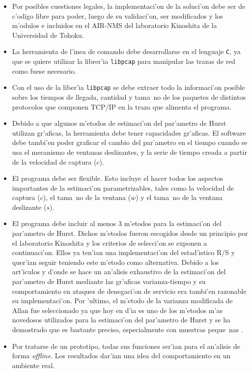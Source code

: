 \begin{itemize}
\item Por posibles cuestiones legales, la implementaci'on de la soluci'on 
debe ser de c'odigo libre para poder, luego de su validaci'on, ser
modificados y los m'odulos e incluidos en el AIR-NMS del laboratorio Kinoshita
de la Universidad de Tohoku.
\item La herramienta de l'inea de comando debe desarrollarse en el lenguaje
{\tt C}, ya que se quiere utilizar la librer'ia {\tt libpcap} para manipular
las trazas de red como fuese necesario.
\item Con el uso de la liber'ia {\tt libpcap} se debe extraer todo la
informaci'on posible sobre los tiempos de llegada, cantidad y tama~no de los
paquetes de distintos protocolos que componen TCP/IP en la traza que alimenta
el programa.
\item Debido a que algunos m'etodos de estimaci'on del par'ametro de Hurst
utilizan gr'aficas, la herramienta debe tener capacidades gr'aficas. 
El software debe tambi'en poder graficar el cambio del par'ametro en el tiempo
cuando se usa el mecanismo de ventanas deslizantes, y la serie de tiempo
creada a partir de la velocidad de captura ($c$).
\item El programa debe ser flexible. Esto incluye el hacer todos los aspectos
importantes de la estimaci'on parametrizables, tales como la velocidad de 
captura ($c$), el tama~no de la ventana ($w$) y el tama~no de la ventana
deslizante ($s$).
\item El programa debe incluir al menos 3 m'etodos para la estimaci'on del 
par'ametro de Hurst. Dichos m'etodos fueron escogidos desde un principio por
el laboratorio Kinoshita y los criterios de selecci'on se exponen a
continuaci'on. Ellos ya ten'ian una implementaci'on del estad'istico R/S y
quer'ian seguir teniendo este m'etodo como alternativa. Debido a los art'iculos 
\cite{intelligentfuzzy} y \cite{xiang:292} d'onde se hace un an'alisis
exhaustivo de la estimaci'on del par'ametro de Hurst mediante las gr'aficas
varianza-tiempo y su comportamiento en ataques de denegaci'on de servicio era
tambi'en razonable su implementaci'on. Por 'ultimo, el m'etodo de la varianza
modificada de Allan fue seleccionado ya que hoy en d'ia es uno de los m'etodos 
m'as novedosos utilizados para la estimaci'on del par'ametro de Hurst y se ha
demostrado que es bastante preciso, especialmente con muestras peque~nas
\cite{MAVARStefano}. 
\item  Por tratarse de un prototipo, todas sus funciones ser'ian para el 
an'alisis de forma {\it offline}. Los resultados dar'ian una idea del
comportamiento en un ambiente real.
\end{itemize}


